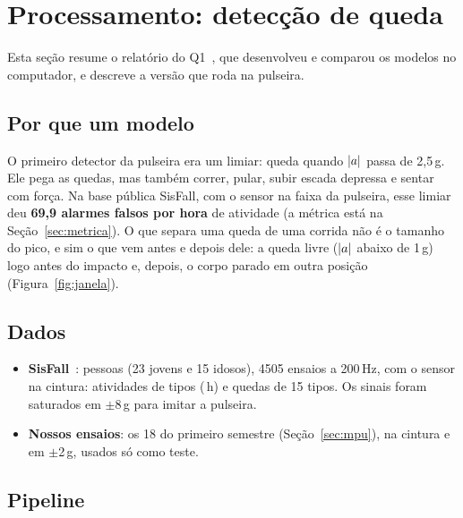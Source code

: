 \section{Processamento: detecção de queda}\label{sec:queda}
Esta seção resume o relatório do Q1~\cite{q1}, que desenvolveu e comparou os modelos no
computador, e descreve a versão que roda na pulseira.

\subsection{Por que um modelo}

O primeiro detector da pulseira era um limiar: queda quando $|a|$ passa de 2,5\,g. Ele pega
as quedas, mas também correr, pular, subir escada depressa e sentar com força. Na base
pública SisFall, com o sensor na faixa da pulseira, esse limiar deu \textbf{69,9 alarmes falsos
por hora} de atividade (a métrica está na Seção~\ref{sec:metrica}). O que separa uma queda de uma corrida não é o tamanho do pico, e sim
o que vem antes e depois dele: a queda livre ($|a|$ abaixo de 1\,g) logo antes do impacto e,
depois, o corpo parado em outra posição (Figura~\ref{fig:janela}).

\subsection{Dados}

\begin{itemize}
  \item \textbf{SisFall}~\cite{sisfall}: \sisPessoas{} pessoas (23 jovens e 15 idosos), 4505
        ensaios a 200\,Hz, com o sensor na cintura: \adlEnsaios{} atividades de \adlTipos{} tipos
        (\adlHoras\,h) e \quedasEnsaios{} quedas de 15 tipos. Os sinais foram saturados em $\pm$8\,g para imitar a
        pulseira.
  \item \textbf{Nossos ensaios}: os 18 do primeiro semestre (Seção~\ref{sec:mpu}), na cintura e
        em $\pm$2\,g, usados só como teste.
\end{itemize}

\subsection{Pipeline}


